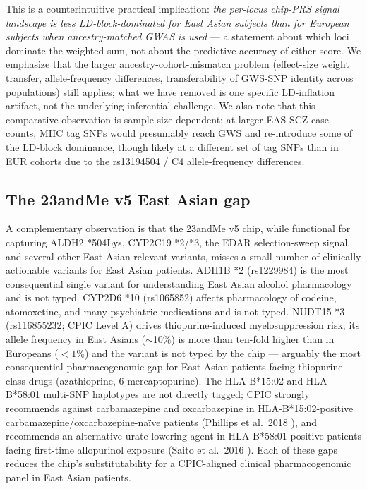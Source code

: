 \documentclass[11pt,a4paper]{article}
\begin{document}
This is a counterintuitive practical implication: \emph{the per-locus chip-PRS signal landscape is less LD-block-dominated for East Asian subjects than for European subjects when ancestry-matched GWAS is used} --- a statement about which loci dominate the weighted sum, not about the predictive accuracy of either score. We emphasize that the larger ancestry-cohort-mismatch problem (effect-size weight transfer, allele-frequency differences, transferability of GWS-SNP identity across populations) still applies; what we have removed is one specific LD-inflation artifact, not the underlying inferential challenge. We also note that this comparative observation is sample-size dependent: at larger EAS-SCZ case counts, MHC tag SNPs would presumably reach GWS and re-introduce some of the LD-block dominance, though likely at a different set of tag SNPs than in EUR cohorts due to the rs13194504 / C4 allele-frequency differences.

\subsection{The 23andMe v5 East Asian gap}
A complementary observation is that the 23andMe v5 chip, while functional for capturing ALDH2 *504Lys, CYP2C19 *2/*3, the EDAR selection-sweep signal, and several other East Asian-relevant variants, misses a small number of clinically actionable variants for East Asian patients. ADH1B *2 (rs1229984) is the most consequential single variant for understanding East Asian alcohol pharmacology and is not typed. CYP2D6 *10 (rs1065852) affects pharmacology of codeine, atomoxetine, and many psychiatric medications and is not typed. NUDT15 *3 (rs116855232; CPIC Level A) drives thiopurine-induced myelosuppression risk; its allele frequency in East Asians ($\sim$10\%) is more than ten-fold higher than in Europeans ($<1\%$) and the variant is not typed by the chip --- arguably the most consequential pharmacogenomic gap for East Asian patients facing thiopurine-class drugs (azathioprine, 6-mercaptopurine). The HLA-B*15:02 and HLA-B*58:01 multi-SNP haplotypes are not directly tagged; CPIC strongly recommends against carbamazepine and oxcarbazepine in HLA-B*15:02-positive carbamazepine/oxcarbazepine-naïve patients (Phillips et al.~2018 \cite{cpic2018hlab1502}), and recommends an alternative urate-lowering agent in HLA-B*58:01-positive patients facing first-time allopurinol exposure (Saito et al.~2016 \cite{cpic2016hlab5801}). Each of these gaps reduces the chip's substitutability for a CPIC-aligned clinical pharmacogenomic panel in East Asian patients.
\end{document}
